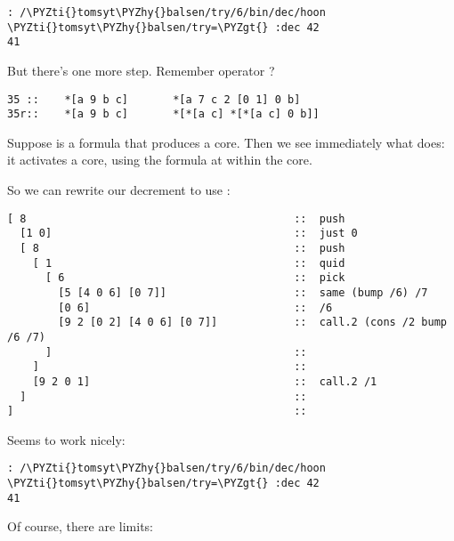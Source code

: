 \begin{framed_shaded}
\begin{Verbatim}[fontsize=\relsize{-2.5},fontseries=b,commandchars=\\\{\}]
: /\PYZti{}tomsyt\PYZhy{}balsen/try/6/bin/dec/hoon
\PYZti{}tomsyt\PYZhy{}balsen/try=\PYZgt{} :dec 42
41
\end{Verbatim}
\end{framed_shaded}
But there's one more step.  Remember operator ?

\begin{framed_shaded}
\begin{Verbatim}[fontsize=\relsize{-2.5},fontseries=b,commandchars=\\\{\}]
35 ::    *[a 9 b c]       *[a 7 c 2 [0 1] 0 b]
35r::    *[a 9 b c]       *[*[a c] *[*[a c] 0 b]]
\end{Verbatim}
\end{framed_shaded}
Suppose  is a formula that produces a core.  Then we see
immediately what  does: it activates a core, using the formula
at  within the core.

So we can rewrite our decrement to use :

\begin{framed_shaded}
\begin{Verbatim}[fontsize=\relsize{-2.5},fontseries=b,commandchars=\\\{\}]
[ 8                                          ::  push
  [1 0]                                      ::  just 0
  [ 8                                        ::  push
    [ 1                                      ::  quid
      [ 6                                    ::  pick
        [5 [4 0 6] [0 7]]                    ::  same (bump /6) /7
        [0 6]                                ::  /6
        [9 2 [0 2] [4 0 6] [0 7]]            ::  call.2 (cons /2 bump /6 /7)
      ]                                      :: 
    ]                                        :: 
    [9 2 0 1]                                ::  call.2 /1
  ]                                          ::
]                                            :: 
\end{Verbatim}
\end{framed_shaded}
Seems to work nicely:

\begin{framed_shaded}
\begin{Verbatim}[fontsize=\relsize{-2.5},fontseries=b,commandchars=\\\{\}]
: /\PYZti{}tomsyt\PYZhy{}balsen/try/6/bin/dec/hoon
\PYZti{}tomsyt\PYZhy{}balsen/try=\PYZgt{} :dec 42
41
\end{Verbatim}
\end{framed_shaded}
Of course, there are limits:

